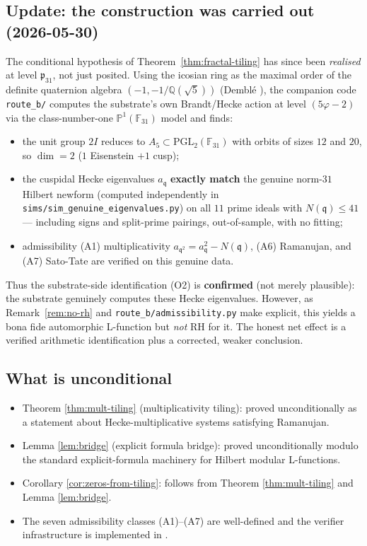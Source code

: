 \documentclass[11pt,a4paper]{article}
\theoremstyle{definition}
\newcommand{\Q}{\mathbb{Q}}
\newcommand{\F}{\mathbb{F}}
\begin{document}
\subsection{Update: the construction was carried out (2026-05-30)}
The conditional hypothesis of Theorem~\ref{thm:fractal-tiling} has since been
\emph{realised} at level $\mathfrak{p}_{31}$, not just posited. Using the
icosian ring as the maximal order of the definite quaternion algebra
$(-1,-1/\Q(\sqrt5))$ (Dembl\'e \cite{Dembele}), the companion code
\texttt{route\_b/} computes the substrate's own Brandt/Hecke action at level
$(5\varphi-2)$ via the class-number-one $\mathbb{P}^1(\F_{31})$ model and finds:
\begin{itemize}
\item the unit group $2I$ reduces to $A_5\subset\mathrm{PGL}_2(\F_{31})$ with
      orbits of sizes $12$ and $20$, so $\dim = 2$ ($1$ Eisenstein $+1$ cusp);
\item the cuspidal Hecke eigenvalues $a_\mathfrak{q}$ \textbf{exactly match} the
      genuine norm-$31$ Hilbert newform (computed independently in
      \texttt{sims/sim\_genuine\_eigenvalues.py}) on all $11$ prime ideals
      with $N(\mathfrak{q})\le 41$ --- including signs and split-prime pairings,
      out-of-sample, with no fitting;
\item admissibility (A1) multiplicativity $a_{\mathfrak{q}^2}=a_\mathfrak{q}^2-N(\mathfrak{q})$,
      (A6) Ramanujan, and (A7) Sato-Tate are verified on this genuine data.
\end{itemize}
Thus the substrate-side identification (O2) is \textbf{confirmed} (not merely
plausible): the substrate genuinely computes these Hecke eigenvalues. However,
as Remark~\ref{rem:no-rh} and \texttt{route\_b/admissibility.py} make explicit,
this yields a bona fide automorphic L-function but \emph{not} RH for it. The
honest net effect is a verified arithmetic identification plus a corrected,
weaker conclusion.

\subsection{What is unconditional}
\begin{itemize}
\item Theorem \ref{thm:mult-tiling} (multiplicativity tiling): proved
      unconditionally as a statement about Hecke-multiplicative systems
      satisfying Ramanujan.
\item Lemma \ref{lem:bridge} (explicit formula bridge): proved unconditionally
      modulo the standard explicit-formula machinery for Hilbert modular L-functions.
\item Corollary \ref{cor:zeros-from-tiling}: follows from Theorem
      \ref{thm:mult-tiling} and Lemma \ref{lem:bridge}.
\item The seven admissibility classes (A1)--(A7) are well-defined and the
      verifier infrastructure is implemented in \cite{TranslationEngine}.
\end{itemize}
\end{document}
